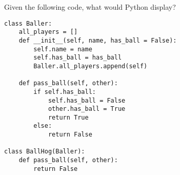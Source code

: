 \begin{blocksection}
\question Given the following code, what would Python display?

\begin{lstlisting}
class Baller:
    all_players = []
    def __init__(self, name, has_ball = False):
        self.name = name
        self.has_ball = has_ball
        Baller.all_players.append(self)

    def pass_ball(self, other):
        if self.has_ball:
            self.has_ball = False
            other.has_ball = True
            return True
        else:
            return False

class BallHog(Baller):
    def pass_ball(self, other):
        return False
\end{lstlisting}
\end{blocksection}

